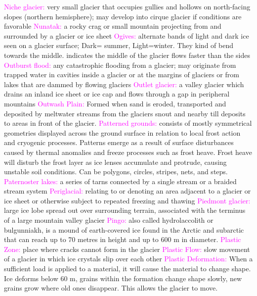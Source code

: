 \documentclass{article}
\newcommand{\pink}[1]{\textcolor{magenta}{#1}}
\newcommand{\vocab}[1]{{\pink{#1}}}
\begin{document}
\begin{multicols*}{4}
		\vocab{        Niche glacier: } very small glacier that occupies gullies and hollows on north-facing slopes (northern hemisphere); may develop into cirque glacier if conditions are favorable 
		\vocab{        Nunatak: } a rocky crag or small mountain projecting from and surrounded by a glacier or ice sheet 
		\vocab{        Ogives: } alternate bands of light and dark ice seen on a glacier surface; Dark= summer, Light=winter. They kind of bend towards the middle. {indicates the middle of the glacier flows faster than the sides} 
		\vocab{        Outburst flood: } any catastrophic flooding from a glacier; may originate from trapped water in cavities inside a glacier or at the margins of glaciers or from lakes that are dammed by flowing glaciers 
		\vocab{        Outlet glacier: } a valley glacier which drains an inland ice sheet or ice cap and flows through a gap in peripheral mountains 
		\vocab{Outwash Plain: } Formed when sand is eroded, transported and deposited by meltwater streams from the glaciers snout and nearby till deposits to areas in front of the glacier.  
		\vocab{        Patterned grounds: } consists of mostly symmetrical geometries displayed across the ground surface in relation to local frost action and cryogenic processes. Patterns emerge as a result of surface disturbances caused by thermal anomalies and freeze processes such as frost heave. Frost heave will disturb the frost layer as ice lenses accumulate and protrude, causing unstable soil conditions. Can be polygons, circles, stripes, nets, and steps.  
		\vocab{        Paternoster lakes: } a series of tarns connected by a single stream or a braided stream system 
		\vocab{        Periglacial: } relating to or denoting an area adjacent to a glacier or ice sheet or otherwise subject to repeated freezing and thawing          
		\vocab{        Piedmont glacier: } large ice lobe spread out over surrounding terrain, associated with the terminus of a large mountain valley glacier 
		\vocab{        Pingo: } also called hydrolaccolith or bulgunniakh, is a mound of earth-covered ice found in the Arctic and subarctic that can reach up to 70 metres in height and up to 600 m in diameter.         
		\vocab{Plastic Zone: } place where cracks cannot form in the glacier  
		\vocab{Plastic Flow: } slow movement of a glacier in which ice crystals slip over each other  
		\vocab{Plastic Deformation: } When a sufficient load is applied to a material, it will cause the material to change shape. Ice deforms below 60 m, grains within the formation change shape slowly, new grains grow where old ones disappear. This allows the glacier to move.  

\end{multicols*}
\end{document}
